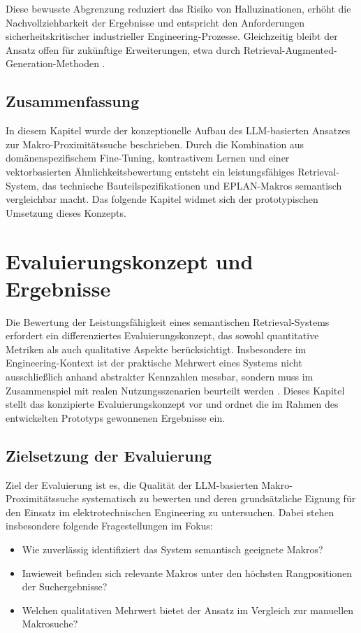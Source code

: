 Diese bewusste Abgrenzung reduziert das Risiko von Halluzinationen, erhöht die Nachvollziehbarkeit der Ergebnisse und entspricht den Anforderungen sicherheitskritischer industrieller Engineering-Prozesse. Gleichzeitig bleibt der Ansatz offen für zukünftige Erweiterungen, etwa durch Retrieval-Augmented-Generation-Methoden \cite{tao_llms_2025}.

\section{Zusammenfassung}

In diesem Kapitel wurde der konzeptionelle Aufbau des LLM-basierten Ansatzes zur Makro-Proximitätssuche beschrieben. Durch die Kombination aus domänenspezifischem Fine-Tuning, kontrastivem Lernen und einer vektorbasierten Ähnlichkeitsbewertung entsteht ein leistungsfähiges Retrieval-System, das technische Bauteilspezifikationen und EPLAN-Makros semantisch vergleichbar macht. Das folgende Kapitel widmet sich der prototypischen Umsetzung dieses Konzepts.





\chapter{Evaluierungskonzept und Ergebnisse}

Die Bewertung der Leistungsfähigkeit eines semantischen Retrieval-Systems erfordert ein differenziertes Evaluierungskonzept, das sowohl quantitative Metriken als auch qualitative Aspekte berücksichtigt. Insbesondere im Engineering-Kontext ist der praktische Mehrwert eines Systems nicht ausschließlich anhand abstrakter Kennzahlen messbar, sondern muss im Zusammenspiel mit realen Nutzungsszenarien beurteilt werden \cite{khanolkar_mapping_2023}. Dieses Kapitel stellt das konzipierte Evaluierungskonzept vor und ordnet die im Rahmen des entwickelten Prototyps gewonnenen Ergebnisse ein.

\section{Zielsetzung der Evaluierung}

Ziel der Evaluierung ist es, die Qualität der LLM-basierten Makro-Proximitätssuche systematisch zu bewerten und deren grundsätzliche Eignung für den Einsatz im elektrotechnischen Engineering zu untersuchen. Dabei stehen insbesondere folgende Fragestellungen im Fokus:
\begin{itemize}
  \item Wie zuverlässig identifiziert das System semantisch geeignete Makros?
  \item Inwieweit befinden sich relevante Makros unter den höchsten Rangpositionen der Suchergebnisse?
  \item Welchen qualitativen Mehrwert bietet der Ansatz im Vergleich zur manuellen Makrosuche?
\end{itemize}

